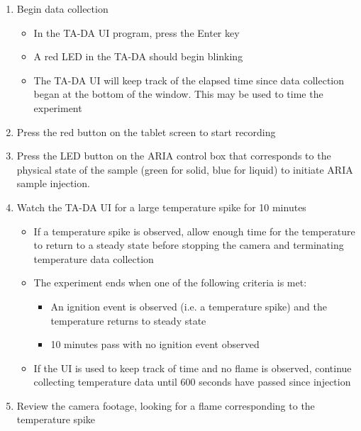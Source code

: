 \documentclass[letterpaper,11pt]{article}
\begin{document}
\begin{enumerate}
	\item Begin data collection 
		\begin{itemize}
		\item In the TA-DA UI program, press the Enter key
		\item A red LED in the TA-DA should begin blinking
		\item The TA-DA UI will keep track of the elapsed time since data 
          collection began at the bottom of the window. This may be used
          to time the experiment
		\end{itemize}
	
    \item Press the red button on the tablet 
        screen to start recording
		
	\item Press the LED button on the ARIA control box that corresponds to the 
        physical state of the sample
		(green for solid, blue for liquid) to initiate ARIA sample injection.
            
    \item Watch the TA-DA UI for a large temperature spike for 10 minutes
        \begin{itemize}
        \item If a temperature spike is observed, allow enough time for the
            temperature to return to a steady state before stopping the camera 
            and terminating temperature data collection
        
        \item The experiment ends when one of the following criteria is met:
            \begin{itemize} 
            \item An ignition event is observed (i.e. a temperature spike) 
                and the temperature returns to steady state
            \item 10 minutes pass with no ignition event observed
            \end{itemize}
        \item If the UI is used to keep track of time and no flame is observed, 
            continue collecting temperature data until 600 seconds have passed 
            since injection
        \end{itemize}
        
    \item Review the camera footage, looking for a flame corresponding to the 
        temperature spike
    

\end{enumerate}
\end{document}
